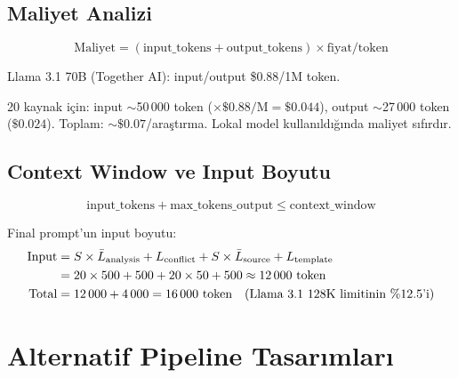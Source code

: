 \subsection{Maliyet Analizi}

\begin{equation}
\label{eq:cost}
\text{Maliyet} = (\text{input\_tokens} + \text{output\_tokens}) \times \text{fiyat/token}
\end{equation}

\begin{ornek}
Llama 3.1 70B (Together AI): input/output \$0.88/1M token.

20 kaynak i\c{c}in: input $\sim$50\,000 token ($\times \$0.88/\text{M} = \$0.044$), output $\sim$27\,000 token ($\$0.024$). Toplam: $\sim\$0.07$/ara\c{s}t{\i}rma. Lokal model kullan{\i}ld{\i}\u{g}{\i}nda maliyet s{\i}f{\i}rd{\i}r.
\end{ornek}

\subsection{Context Window ve Input Boyutu}

\begin{equation}
\label{eq:context_check}
\text{input\_tokens} + \text{max\_tokens\_output} \leq \text{context\_window}
\end{equation}

Final prompt'un input boyutu:
\begin{align}
\text{Input} &= S \times \bar{L}_{\text{analysis}} + L_{\text{conflict}} + S \times \bar{L}_{\text{source}} + L_{\text{template}} \notag \\
&= 20 \times 500 + 500 + 20 \times 50 + 500 \approx 12\,000 \text{ token} \label{eq:input_size} \\
\text{Total} &= 12\,000 + 4\,000 = 16\,000 \text{ token} \quad (\text{Llama 3.1 128K limitinin \%12.5'i}) \notag
\end{align}


\section{Alternatif Pipeline Tasar{\i}mlar{\i}}
\label{sec:alternatives}

